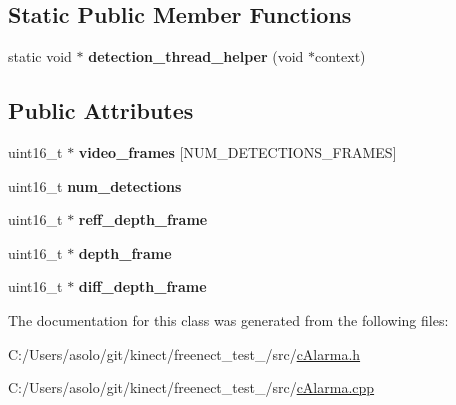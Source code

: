 \subsection*{Static Public Member Functions}
\begin{DoxyCompactItemize}
\item 
\mbox{\label{classc_alarma_acfd2c0f279929720813d8449839ee9d8}} 
static void $\ast$ {\bfseries detection\+\_\+thread\+\_\+helper} (void $\ast$context)
\end{DoxyCompactItemize}
\subsection*{Public Attributes}
\begin{DoxyCompactItemize}
\item 
\mbox{\label{classc_alarma_ab18c83dcddc8a4562caa7f0eaf2c18fa}} 
uint16\+\_\+t $\ast$ {\bfseries video\+\_\+frames} \mbox{[}N\+U\+M\+\_\+\+D\+E\+T\+E\+C\+T\+I\+O\+N\+S\+\_\+\+F\+R\+A\+M\+ES\mbox{]}
\item 
\mbox{\label{classc_alarma_a780a53e6dbed9c98bd574d0f012eec75}} 
uint16\+\_\+t {\bfseries num\+\_\+detections}
\item 
\mbox{\label{classc_alarma_a24029c7b79ae503e28bf5936fbf72d17}} 
uint16\+\_\+t $\ast$ {\bfseries reff\+\_\+depth\+\_\+frame}
\item 
\mbox{\label{classc_alarma_a27d71fbbd31b8241369d306d5a0592f1}} 
uint16\+\_\+t $\ast$ {\bfseries depth\+\_\+frame}
\item 
\mbox{\label{classc_alarma_ab21123b6db7305cd1fd42916f78b6ee7}} 
uint16\+\_\+t $\ast$ {\bfseries diff\+\_\+depth\+\_\+frame}
\end{DoxyCompactItemize}


The documentation for this class was generated from the following files\+:\begin{DoxyCompactItemize}
\item 
C\+:/\+Users/asolo/git/kinect/freenect\+\_\+test\+\_/src/\mbox{\hyperlink{c_alarma_8h}{c\+Alarma.\+h}}\item 
C\+:/\+Users/asolo/git/kinect/freenect\+\_\+test\+\_/src/\mbox{\hyperlink{c_alarma_8cpp}{c\+Alarma.\+cpp}}\end{DoxyCompactItemize}
